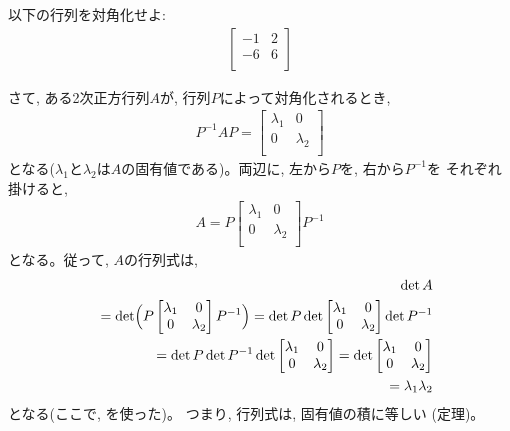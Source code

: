 \begin{q}\label{q:matrix_orth2D0} 以下の行列を対角化せよ:
\begin{eqnarray} \begin{bmatrix}
-1 & 2\\
-6 & 6\\
\end{bmatrix}\end{eqnarray}
\end{q}\mv

さて, ある2次正方行列$A$が, 行列$P$によって対角化されるとき, 
\begin{eqnarray}
P^{-1}AP
=\begin{bmatrix}
\lambda_1 & 0 \\
0 & \lambda_2 \\
\end{bmatrix}
\end{eqnarray}
となる($\lambda_1$と$\lambda_2$は$A$の固有値である)。両辺に, 左から$P$を, 右から$P^{-1}$を
それぞれ掛けると, 
\begin{eqnarray}
A
=P\begin{bmatrix}
\lambda_1 & 0 \\
0 & \lambda_2 \\
\end{bmatrix}P^{-1}
\end{eqnarray}
となる。従って, $A$の行列式は, 
\begin{eqnarray}
&&\det A\nonumber\\
&&=\det\Bigl(P\begin{bmatrix}
\lambda_1 & 0 \\
0 & \lambda_2 \\
\end{bmatrix}P^{-1}\Bigr)
=\det P\det\begin{bmatrix}
\lambda_1 & 0 \\
0 & \lambda_2 \\
\end{bmatrix}\det P^{-1}\nonumber\\
&&=\det P\det P^{-1}\det\begin{bmatrix}
\lambda_1 & 0 \\
0 & \lambda_2 \\
\end{bmatrix}=\det\begin{bmatrix}
\lambda_1 & 0 \\
0 & \lambda_2 \\
\end{bmatrix}\nonumber\\
&&=\lambda_1\lambda_2
\end{eqnarray}
となる(ここで, を使った)。
つまり, 行列式は, 固有値の積に等しい (定理)。
\hv






